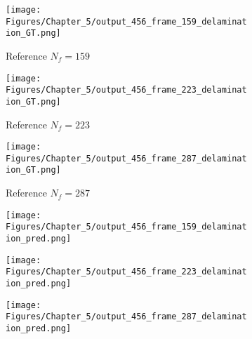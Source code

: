 \begin{figure} [!ht]
	\centering
	\begin{subfigure}[b]{.32\textwidth}
		\centering
		\texttt{[image: Figures/Chapter\_5/output\_456\_frame\_159\_delamination\_GT.png]}
		\caption{Reference $N_f=159$}
		\label{fig:ref_456_damage_159}
	\end{subfigure}
	\hfill
	\begin{subfigure}[b]{.32\textwidth}
		\centering
		\texttt{[image: Figures/Chapter\_5/output\_456\_frame\_223\_delamination\_GT.png]}
		\caption{Reference $N_f=223$}
		\label{fig:ref_456_damage_223}
	\end{subfigure}
	\hfill
	\begin{subfigure}[b]{.32\textwidth}
		\centering
		\texttt{[image: Figures/Chapter\_5/output\_456\_frame\_287\_delamination\_GT.png]}
		\caption{Reference $N_f=287$}
		\label{fig:ref_456_damage_287}	
	\end{subfigure}
	\hfill
	\begin{subfigure}[b]{.32\textwidth}
		\centering
		\texttt{[image: Figures/Chapter\_5/output\_456\_frame\_159\_delamination\_pred.png]}
		\caption{}
		\label{fig:pred_456_damage_159}
	\end{subfigure}
	\hfill
	\begin{subfigure}[b]{.32\textwidth}
		\centering
		\texttt{[image: Figures/Chapter\_5/output\_456\_frame\_223\_delamination\_pred.png]}
		\caption{}
		\label{fig:pred_456_damage_223}
	\end{subfigure}
	\hfill
	\begin{subfigure}[b]{.32\textwidth}
		\centering
		\texttt{[image: Figures/Chapter\_5/output\_456\_frame\_287\_delamination\_pred.png]}
		\caption{}
		\label{fig:pred_456_damage_287}	
	\end{subfigure}
	\caption{}
	\label{fig:num_results_CS_damage_area_456}
\end{figure}


